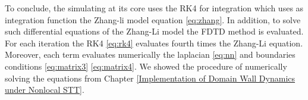 \vspace{4.0em}

To conclude, the simulating at its core uses the RK4 for integration which uses as integration function the Zhang-li model equation \ref{eq:zhang}. In addition, to solve such differential equations of the Zhang-Li model the FDTD method is evaluated. For each iteration the RK4 \ref{eq:rk4} evaluates fourth times the Zhang-Li equation. Moreover, each term evaluates numerically the laplacian \ref{eq:nn} and boundaries conditions \ref{eq:matrix3} \ref{eq:matrix4}. We showed the procedure of numerically solving the equations from Chapter \ref{Implementation of Domain Wall Dynamics under Nonlocal STT}.



